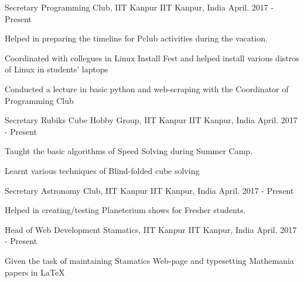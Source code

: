 


\begin{cventries}

  \cventry
    {Secretary }
    {Programming Club, IIT Kanpur}
    {IIT Kanpur, India}
    {April. 2017 - Present}
    {
      \begin{cvitems}
        \item {Helped in preparing the timeline for Pclub activities during the  vacation.}
		\item {Coordinated with collegues in Linux Install Fest and helped install various distros of Linux in students' laptops}
		\item {Conducted a lecture in basic python and web-scraping with the Coordinator of Programming Club}
      \end{cvitems}
    }

  \cventry
    {Secretary }
    {Rubiks Cube Hobby Group, IIT Kanpur}
    {IIT Kanpur, India}
    {April. 2017 - Present}
    {
      \begin{cvitems}
        \item {Taught the basic algorithms of Speed Solving during Summer Camp. }
		\item {Learnt various techniques of Blind-folded cube solving}
      \end{cvitems}
    }

  \cventry
    {Secretary }
    {Astronomy Club, IIT Kanpur}
    {IIT Kanpur, India}
    {April. 2017 - Present}
    {
      \begin{cvitems}
        \item {Helped in creating/testing Planeterium shows for Fresher students.}
      \end{cvitems}
    }

  \cventry
    {Head of Web Development }
    {Stamatics, IIT Kanpur}
    {IIT Kanpur, India}
    {April. 2017 - Present}
    {
      \begin{cvitems}
        \item {Given the task of maintaining Stamatics Web-page and typesetting Mathemania papers in \LaTeX}
      \end{cvitems}
    }
\end{cventries}


